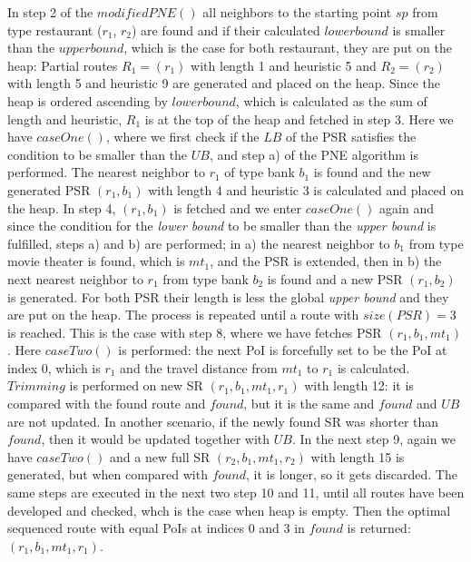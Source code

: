 In step 2 of the $modifiedPNE()$ all neighbors to the starting point $sp$ from type restaurant ($r_1$, $r_2$) are found and if their calculated $lower bound$ is smaller than the $upper bound$, which is the case for both restaurant, they are put on the heap: Partial routes $R_1 = (r_1)$ with length 1 and heuristic 5 and $R_2 = (r_2)$ with length 5 and heuristic 9 are generated and placed on the heap. Since the heap is ordered ascending by $lower bound$, which is calculated as the sum of length and heuristic, $R_1$ is at the top of the heap and fetched in step 3. Here we have $caseOne()$, where we first check if the $LB$ of the PSR satisfies the condition to be smaller than the $UB$, and step a) of the PNE algorithm is performed. The nearest neighbor to $r_1$ of type bank $b_1$ is found and the new generated PSR $(r_1, b_1)$ with length 4 and heuristic 3 is calculated and placed on the heap. In step 4, $(r_1, b_1)$ is fetched and we enter $caseOne()$ again and since the condition for the \textit{lower bound} to be smaller than the \textit{upper bound} is fulfilled, steps a) and b) are performed; in a) the nearest neighbor to $b_1$ from type movie theater is found, which is $mt_1$, and the PSR is extended, then in b) the next nearest neighbor to $r_1$ from type bank $b_2$ is found and a new PSR $(r_1, b_2)$ is generated. For both PSR their length is less the global \textit{upper bound} and they are put on the heap. The process is repeated until a route with $size(PSR) = 3$ is reached. This is the case with step 8, where we have fetches PSR $(r_1, b_1, mt_1)$. Here $caseTwo()$ is performed: the next PoI is forcefully set to be the PoI at index 0, which is $r_1$ and the travel distance from $mt_1$ to $r_1$ is calculated. $Trimming$ is performed on new SR $(r_1, b_1, mt_1, r_1)$ with length 12: it is compared with the found route and $found$, but it is the same and $found$ and $UB$ are not updated. In another scenario, if the newly found SR was shorter than $found$, then it would be updated together with $UB$. In the next step 9, again we have $caseTwo()$ and a new full SR $(r_2, b_1, mt_1, r_2)$ with length 15 is generated, but when compared with $found$, it is longer, so it gets discarded. The same steps are executed in the next two step 10 and 11, until all routes have been developed and checked, whch is the case when heap is empty. Then the optimal sequenced route with equal PoIs at indices 0 and 3 in $found$ is returned: $(r_1, b_1, mt_1, r_1)$.


